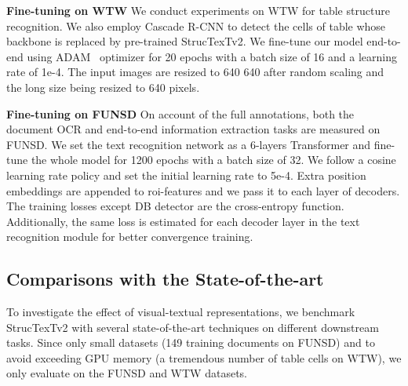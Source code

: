 \documentclass{article} \usepackage{iclr2023_conference,times}
\begin{document}
\noindent\textbf{Fine-tuning on WTW} We conduct experiments on WTW for table structure recognition. We also employ Cascade R-CNN to detect the cells of table whose backbone is replaced by pre-trained StrucTexTv2. We fine-tune our model end-to-end using ADAM~\cite{kingma2014adam} optimizer for 20 epochs with a batch size of 16 and a learning rate of 1e-4. The input images are resized to 640  640 after random scaling and the long size being resized to 640 pixels.

\noindent\textbf{Fine-tuning on FUNSD} On account of the full annotations, both the document OCR and end-to-end information extraction tasks are measured on FUNSD. We set the text recognition network as a 6-layers Transformer and fine-tune the whole model for 1200 epochs with a batch size of 32. We follow a cosine learning rate policy and set the initial learning rate to 5e-4. Extra position embeddings are appended to roi-features and we pass it to each layer of decoders. The training losses except DB detector are the cross-entropy function. Additionally, the same loss is estimated for each decoder layer in the text recognition module for better convergence training.

\subsection{Comparisons with the State-of-the-art}
To investigate the effect of visual-textual representations, we benchmark StrucTexTv2 with several state-of-the-art techniques on different downstream tasks. Since only small datasets (149 training documents on FUNSD) and to avoid exceeding GPU memory (a tremendous number of table cells on WTW), we only evaluate  on the FUNSD and WTW datasets.
\end{document}
